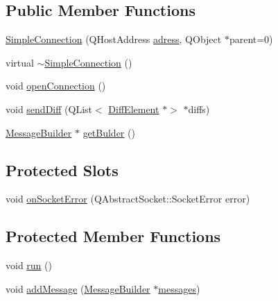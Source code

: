 \subsection*{Public Member Functions}
\begin{DoxyCompactItemize}
\item 
\hyperlink{a00125_a2bcb23e4dcb42f9149d6c66b326fc475}{Simple\+Connection} (Q\+Host\+Address \hyperlink{a00125_afd0b4e345d57b690f1a1e12c4816e268}{adress}, Q\+Object $\ast$parent=0)
\item 
virtual \hyperlink{a00125_a61b33627900c86ffa7f7936acae2873a}{$\sim$\+Simple\+Connection} ()
\item 
void \hyperlink{a00125_a47370c85490330b8e1dd64af9e70b683}{open\+Connection} ()
\item 
void \hyperlink{a00125_ab580ce17f2b9632414475a49dff64cce}{send\+Diff} (Q\+List$<$ \hyperlink{a00141}{Diff\+Element} $\ast$$>$ $\ast$diffs)
\item 
\hyperlink{a00129}{Message\+Builder} $\ast$ \hyperlink{a00125_a2bbd5504e2e67fa95a701f77cd438f4d}{get\+Bulder} ()
\end{DoxyCompactItemize}
\subsection*{Protected Slots}
\begin{DoxyCompactItemize}
\item 
void \hyperlink{a00125_a8360af71c89a54be93430b746d5fae08}{on\+Socket\+Error} (Q\+Abstract\+Socket\+::\+Socket\+Error error)
\end{DoxyCompactItemize}
\subsection*{Protected Member Functions}
\begin{DoxyCompactItemize}
\item 
void \hyperlink{a00125_a35045483589d14a436ee83346365ce70}{run} ()
\item 
void \hyperlink{a00125_a0e40869759ba98f1964257d9c507b733}{add\+Message} (\hyperlink{a00129}{Message\+Builder} $\ast$\hyperlink{a00125_aadfc449afe00e48e200ae5f94bc9f2f7}{messages})
\end{DoxyCompactItemize}
